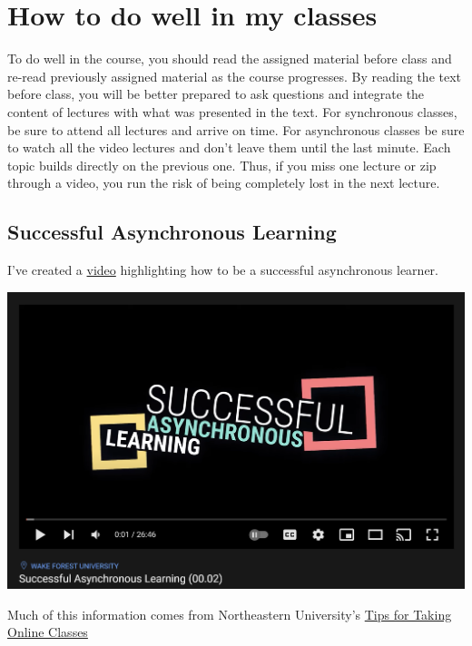 \documentclass[
]{book}
\begin{document}
\hypertarget{how-to-do-well-in-my-classes}{%
\chapter{How to do well in my classes}\label{how-to-do-well-in-my-classes}}

To do well in the course, you should read the assigned material before class and re-read previously assigned material as the course progresses.
By reading the text before class, you will be better prepared to ask questions and integrate the content of lectures with what was presented in the text.
For synchronous classes, be sure to attend all lectures and arrive on time.
For asynchronous classes be sure to watch all the video lectures and don't leave them until the last minute. Each topic builds directly on the previous one.
Thus, if you miss one lecture or zip through a video, you run the risk of being completely lost in the next lecture.

\hypertarget{successful-asynchronous-learning}{%
\section{Successful Asynchronous Learning}\label{successful-asynchronous-learning}}

I've created a \href{https://youtu.be/dc3D2tbl8G0}{video} highlighting how to be a successful asynchronous learner.

\includegraphics[width=30.76in]{img/learngood}

Much of this information comes from Northeastern University's \href{https://www.northeastern.edu/graduate/blog/tips-for-taking-online-classes/}{Tips for Taking Online Classes}

  
\end{document}
